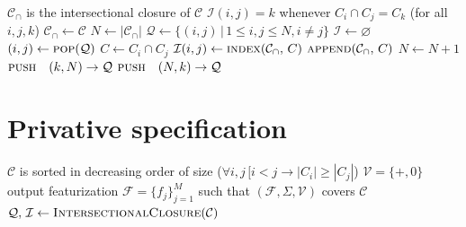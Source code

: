 \documentclass[11pt, oneside]{article}   	%
\begin{document}
\vspace{\baselineskip} \noindent \begin{algorithmic}
    \ENSURE $\mathcal C_\cap$ is the intersectional closure of $\mathcal C$
    \ENSURE $\mathcal I(i,j) = k$ whenever $C_i \cap C_j = C_k$ (for all $i, j, k$)
    \STATE
    \STATE $\mathcal C_\cap \leftarrow \mathcal C$ \quad \quad \quad \quad \quad \quad \quad \quad \quad \quad \quad \quad {}
    \STATE $N \leftarrow | \mathcal C_\cap |$ \quad \quad \quad \quad \quad \quad \quad \quad \quad \quad \quad {}
    \STATE $\mathcal Q \leftarrow \{ (i, j) \, | \, 1 \leq i, j \leq N, i \neq j \}$ \quad {}
    \STATE $\mathcal I \leftarrow \varnothing$ \quad \quad \quad \quad \quad \quad \quad \quad \quad \quad \quad \quad {}
    \STATE
        \STATE $(i, j) \leftarrow \textsc{pop}(\mathcal Q)$
            \STATE $C \leftarrow C_i \cap C_j$
                \STATE $\mathcal I(i, j) \leftarrow \textsc{index}(\mathcal C_\cap, \, C)$
            \ELSE
                \STATE $\textsc{append}(\mathcal C_\cap, \, C)$
                \STATE $N \leftarrow N+1$
                    \STATE $\textsc{push} \quad (k, N) \rightarrow \mathcal Q$
                    \STATE $\textsc{push} \quad(N, k) \rightarrow \mathcal Q$
                \ENDFOR
            \ENDIF
        \ENDIF
    \ENDWHILE
\end{algorithmic}

\section{Privative specification}


\vspace{\baselineskip} \noindent \begin{algorithmic}
    \REQUIRE $\mathcal C$ is sorted in decreasing order of size ($\forall i, j \, [i < j \rightarrow |C_i| \geq |C_j|$)
    \REQUIRE $\mathcal V = \{ +, 0 \}$
    \ENSURE output featurization $\mathcal F = \{ f_j \}_{j=1}^M$ such that $(\mathcal F, \Sigma, \mathcal V)$ covers $\mathcal C$
    \STATE
    \STATE $\mathcal Q, \, \mathcal I \leftarrow \textsc{IntersectionalClosure}(\mathcal C)$
        \STATE 
    \ENDWHILE
\end{algorithmic}
\end{document}
